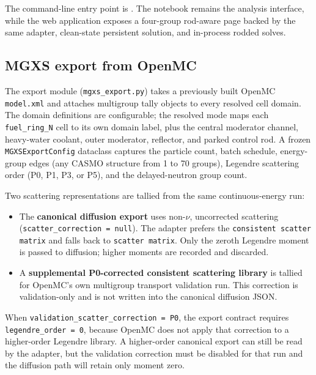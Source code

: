 \documentclass[11pt]{article}
\begin{document}
The command-line entry point is
.  The notebook
 remains the analysis
interface, while the web application exposes a four-group rod-aware page
backed by the same adapter, clean-state persistent solution, and in-process
rodded solves.

\subsection{MGXS export from OpenMC}

The export module (\texttt{mgxs\_export.py}) takes a previously built OpenMC
\texttt{model.xml} and attaches multigroup tally objects to every resolved
cell domain.  The domain definitions are configurable; the resolved mode maps
each \texttt{fuel\_ring\_N} cell to its own domain label, plus the central
moderator channel, heavy-water coolant, outer moderator, reflector, and
parked control rod.  A frozen \texttt{MGXSExportConfig} dataclass captures the
particle count, batch schedule, energy-group edges (any CASMO structure from
1 to 70 groups), Legendre scattering order (P0, P1, P3, or P5), and the
delayed-neutron group count.

Two scattering representations are tallied from the same continuous-energy
run:
\begin{itemize}
  \item The \textbf{canonical diffusion export} uses non-$\nu$, uncorrected
        scattering (\texttt{scatter\_correction = null}).  The adapter prefers
        the \texttt{consistent scatter matrix} and falls back to
        \texttt{scatter matrix}.  Only the zeroth Legendre moment is passed to
        diffusion; higher moments are recorded and discarded.
  \item A \textbf{supplemental P0-corrected consistent scattering library}
        is tallied for OpenMC's own multigroup transport validation run.
        This correction is validation-only and is not written into the
        canonical diffusion JSON.
\end{itemize}

When \texttt{validation\_scatter\_correction = P0}, the export contract requires
\texttt{legendre\_order = 0}, because OpenMC does not apply that correction to
a higher-order Legendre library.  A higher-order canonical export can still be
read by the adapter, but the validation correction must be disabled for that
run and the diffusion path will retain only moment zero.
\end{document}
